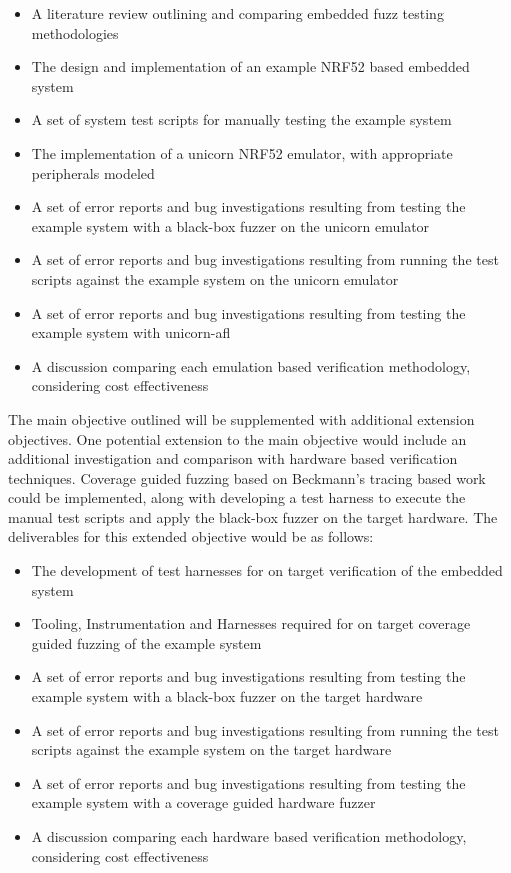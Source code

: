 \documentclass[11pt]{article}
\begin{document}
\begin{itemize}
\item A literature review outlining and comparing embedded fuzz testing methodologies
\item The design and implementation of an example NRF52 based embedded system
\item A set of system test scripts for manually testing the example system
\item The implementation of a unicorn NRF52 emulator, with appropriate peripherals modeled
\item A set of error reports and bug investigations resulting from testing the example system with a black-box fuzzer on the unicorn emulator
\item A set of error reports and bug investigations resulting from running the test scripts against the example system on the unicorn emulator
\item A set of error reports and bug investigations resulting from testing the example system with unicorn-afl
\item A discussion comparing each emulation based verification methodology, considering cost effectiveness
\end{itemize}

The main objective outlined will be supplemented with additional extension
objectives. One potential extension to the main objective would include an
additional investigation and comparison with hardware based verification
techniques. Coverage guided fuzzing based on Beckmann's tracing based work
\citep{Beckmann_2023} could be implemented, along with developing a test
harness to execute the manual test scripts and apply the black-box fuzzer on
the target hardware. The deliverables for this extended objective would be as follows:

\begin{itemize}
\item The development of test harnesses for on target verification of the embedded system
\item Tooling, Instrumentation and Harnesses required for on target coverage guided fuzzing of the example system
\item A set of error reports and bug investigations resulting from testing the example system with a black-box fuzzer on the target hardware
\item A set of error reports and bug investigations resulting from running the test scripts against the example system on the target hardware
\item A set of error reports and bug investigations resulting from testing the example system with a coverage guided hardware fuzzer
\item A discussion comparing each hardware based verification methodology, considering cost effectiveness
\end{itemize}
\end{document}
